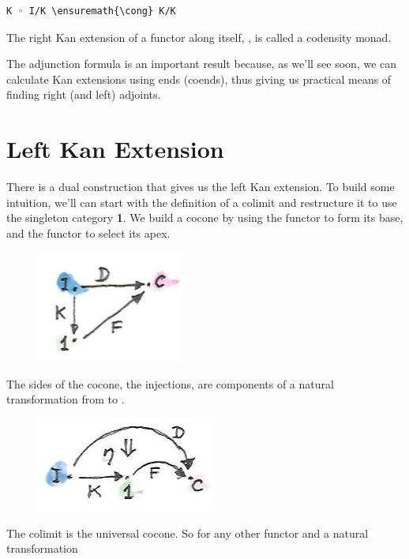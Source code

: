 \begin{Verbatim}[commandchars=\\\{\}]
K ◦ I/K \ensuremath{\cong} K/K
\end{Verbatim}
The right Kan extension of a functor along itself, , is
called a codensity monad.

The adjunction formula is an important result because, as we'll see
soon, we can calculate Kan extensions using ends (coends), thus giving
us practical means of finding right (and left) adjoints.

\section{Left Kan Extension}\label{left-kan-extension}

There is a dual construction that gives us the left Kan extension. To
build some intuition, we'll can start with the definition of a colimit
and restructure it to use the singleton category \textbf{1}. We build a
cocone by using the functor  to form its
base, and the functor  to select its apex.

\begin{figure}[H]
\centering
\includegraphics[width=1.90625in]{images/kan81.jpg}
\end{figure}

\noindent
The sides of the cocone, the injections, are components of a natural
transformation  from  to .

\begin{figure}[H]
\centering
\includegraphics[width=2.33333in]{images/kan10a.jpg}
\end{figure}

\noindent
The colimit is the universal cocone. So for any other functor
 and a natural transformation

